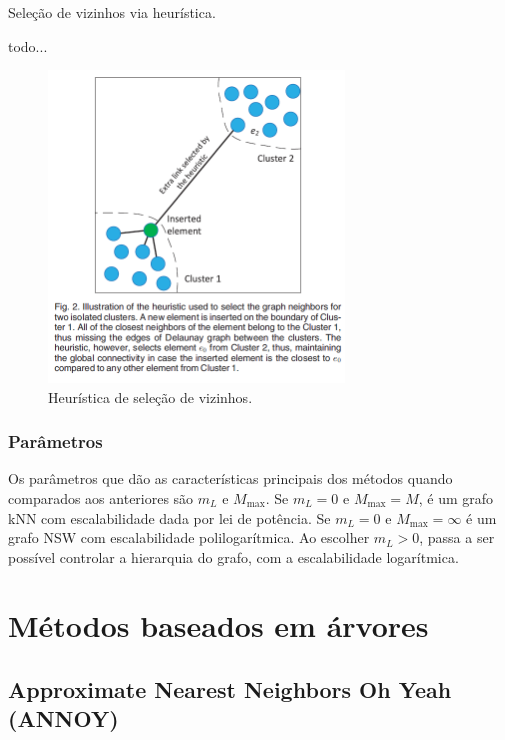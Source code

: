 \begin{algorithm}
\caption{Seleção de vizinhos via heurística.}
\begin{algorithmic}[1]
\State todo...
\EndProcedure
\end{algorithmic}
\end{algorithm}

\begin{figure}
    \centering
    \includegraphics[width=0.7\textwidth]{imgs/hnsw_heuristic.png}
    \caption{Heurística de seleção de vizinhos.}
    \label{fig:hnsw_heuristic}
\end{figure}

\subsubsection{Parâmetros}

Os parâmetros que dão as características principais dos métodos quando comparados aos anteriores são $m_L$ e $M_\text{max}$. Se $m_L=0$ e $M_\text{max}=M$, é um grafo kNN com escalabilidade dada por lei de potência. Se $m_L=0$ e $M_\text{max}=\infty$ é um grafo NSW com escalabilidade polilogarítmica. Ao escolher $m_L>0$, passa a ser possível controlar a hierarquia do grafo, com a escalabilidade logarítmica.



\section{Métodos baseados em árvores}

\subsection{Approximate Nearest Neighbors Oh Yeah (ANNOY)}

